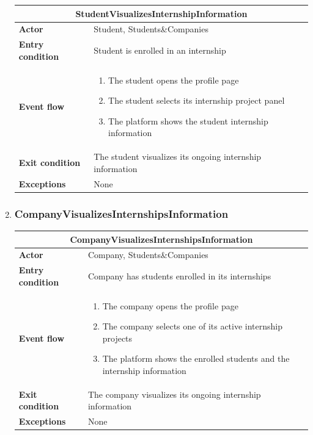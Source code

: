 \begin{enumerate}[label=\textbf{UC\arabic* -}]
\begin{table}[H]
    \centering
    \begin{tabular}{|l|m{10cm}|}
        \hline \multicolumn{2}{|c|}{\textbf{StudentVisualizesInternshipInformation}} \\
        \hline \textbf{Actor} & Student, Students\&Companies \\
        \hline \textbf{Entry condition} & Student is enrolled in an internship \\
        \hline \textbf{Event flow} &
            \begin{enumerate}[label=\arabic*]
                \item The student opens the profile page
                \item The student selects its internship project panel
                \item The platform shows the student internship information
            \end{enumerate} \\
        \hline \textbf{Exit condition} & The student visualizes its ongoing internship information \\
        \hline \textbf{Exceptions} & None \\
        \hline
    \end{tabular}
\end{table}

\item \subsubsection{CompanyVisualizesInternshipsInformation}

\begin{table}[H]
    \centering
    \begin{tabular}{|l|m{10cm}|}
        \hline \multicolumn{2}{|c|}{\textbf{CompanyVisualizesInternshipsInformation}} \\
        \hline \textbf{Actor} & Company, Students\&Companies \\
        \hline \textbf{Entry condition} & Company has students enrolled in its internships \\
        \hline \textbf{Event flow} &
            \begin{enumerate}[label=\arabic*]
                \item The company opens the profile page
                \item The company selects one of its active internship projects
                \item The platform shows the enrolled students and the internship information
            \end{enumerate} \\
        \hline \textbf{Exit condition} & The company visualizes its ongoing internship information \\
        \hline \textbf{Exceptions} & None \\
        \hline
    \end{tabular}
\end{table}


\end{enumerate}
